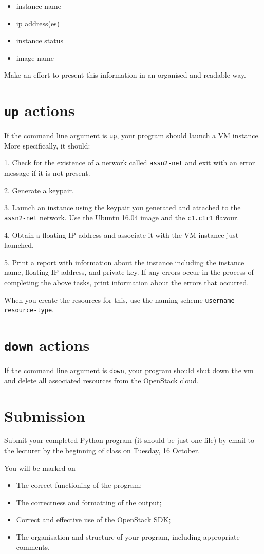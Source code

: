 \documentclass{article}
\begin{document}
\begin{itemize}
  \item instance name
  \item ip address(es)
  \item instance status
  \item image name
\end{itemize}

Make an effort to present this information in an organised and readable way.

\section{\texttt{up} actions}
If the command line argument is \texttt{up}, your program should launch a VM instance. More specifically, it should:

1. Check for the existence of a network called \texttt{assn2-net} and exit with an error message if it is not present.

2. Generate a keypair.

3. Launch an instance using the keypair you generated and attached to the \texttt{assn2-net} network. Use the Ubuntu 16.04 image and the \texttt{c1.c1r1} flavour.

4. Obtain a floating IP address and associate it with the VM instance just launched.

5. Print a report with information about the instance including the instance name, floating IP address, and private key. If any errors occur in the process of completing the above tasks, print information about the errors that occurred.

When you create the resources for this, use the naming scheme \texttt{username-resource-type}.

\section{\texttt{down} actions}
If the command line argument is \texttt{down}, your program should shut down the vm and delete all associated resources from the OpenStack cloud.


\section{Submission}
Submit your completed Python program (it should be just one file) by email to the lecturer by the beginning of class on Tuesday, 16 October.

You will be marked on 

\begin{itemize}
  \item The correct functioning of the program;
  \item The correctness and formatting of the output;
  \item Correct and effective use of the OpenStack SDK;
  \item The organisation and structure of your program, including appropriate comments.
  \end{itemize}
  
  
\end{document}
